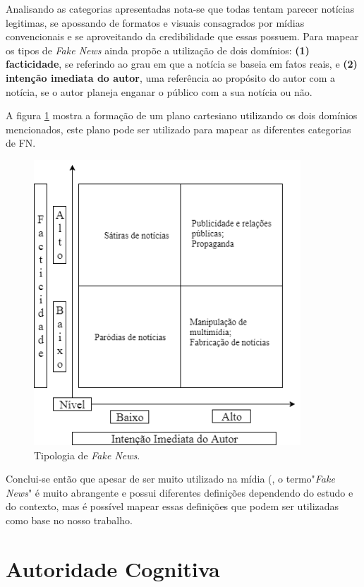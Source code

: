 Analisando as categorias apresentadas nota-se que todas tentam parecer notícias legitimas, se apossando de formatos e visuais consagrados por mídias convencionais e se aproveitando da credibilidade que essas possuem. Para mapear os tipos de \emph{Fake News} \cite{tandoc_defining_2017} ainda propõe a utilização de dois domínios: \textbf{(1) facticidade}, se referindo ao grau em que a notícia se baseia em fatos reais, e \textbf{(2) intenção imediata do autor}, uma referência ao propósito do autor com a notícia, se o autor planeja enganar o público com a sua notícia ou não.

A figura \ref{fig:topologia_fn} mostra a formação de um plano cartesiano utilizando os dois domínios mencionados, este plano pode ser utilizado para mapear as diferentes categorias de FN.

\begin{figure}[!htb]
\centering
\includegraphics[width=10cm]{2-fundamentacao/typology_fake_news.png}
\caption{Tipologia de \emph{Fake News}.}
\label{fig:topologia_fn}
\end{figure}

Conclui-se então que apesar de ser muito utilizado na mídia (\cite{liliana_bounegru_field}, o termo"\emph{Fake News}" é muito abrangente e possui diferentes definições dependendo do estudo e do contexto, mas é possível mapear essas definições que podem ser utilizadas como base no nosso trabalho.

\section{Autoridade Cognitiva}

